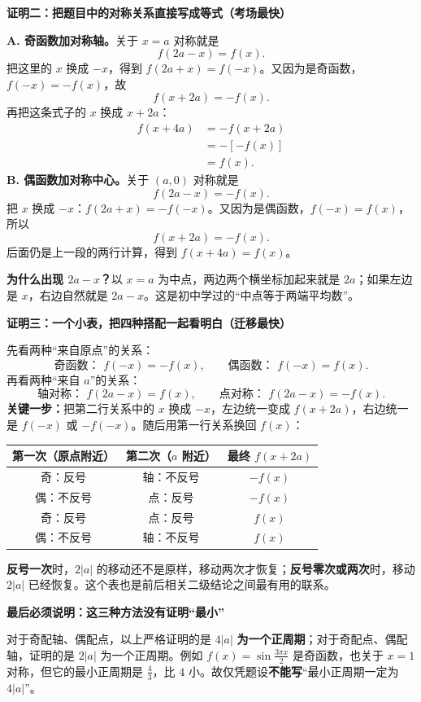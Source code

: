 \begin{proofbox}
\textbf{\textcolor{CProof}{证明二：把题目中的对称关系直接写成等式（考场最快）}}



\textbf{A. 奇函数加对称轴。}关于 $x=a$ 对称就是
\[
f(2a-x)=f(x).
\]
把这里的 $x$ 换成 $-x$，得到 $f(2a+x)=f(-x)$。又因为是奇函数，$f(-x)=-f(x)$，故
\[
\boxed{f(x+2a)=-f(x)}.
\]
再把这条式子的 $x$ 换成 $x+2a$：
\[
\begin{aligned}
f(x+4a)&=-f(x+2a)\\
&=-[-f(x)]\\
&=f(x).
\end{aligned}
\]
\textbf{B. 偶函数加对称中心。}关于 $(a,0)$ 对称就是
\[
f(2a-x)=-f(x).
\]
把 $x$ 换成 $-x$：$f(2a+x)=-f(-x)$。又因为是偶函数，$f(-x)=f(x)$，所以
\[
\boxed{f(x+2a)=-f(x)}.
\]
后面仍是上一段的两行计算，得到 $f(x+4a)=f(x)$。

\textbf{为什么出现 $2a-x$？}以 $x=a$ 为中点，两边两个横坐标加起来就是 $2a$；如果左边是 $x$，右边自然就是 $2a-x$。这是初中学过的“中点等于两端平均数”。

\medskip

\end{proofbox}
\clearpage
\begin{proofbox}
\textbf{\textcolor{CProof}{证明三：一个小表，把四种搭配一起看明白（迁移最快）}}



先看两种“来自原点”的关系：
\[
\text{奇函数： }f(-x)=-f(x),\qquad
\text{偶函数： }f(-x)=f(x).
\]
再看两种“来自 $a$”的关系：
\[
\text{轴对称： }f(2a-x)=f(x),\qquad
\text{点对称： }f(2a-x)=-f(x).
\]
\textbf{关键一步：}把第二行关系中的 $x$ 换成 $-x$，左边统一变成 $f(x+2a)$，右边统一是 $f(-x)$ 或 $-f(-x)$。随后用第一行关系换回 $f(x)$：
\begin{center}
\begin{tabular}{c|c|c}
第一次（原点附近）& 第二次（$a$ 附近） & 最终 $f(x+2a)$\\ \hline
奇：反号 & 轴：不反号 & $-f(x)$\\
偶：不反号 & 点：反号 & $-f(x)$\\
奇：反号 & 点：反号 & $f(x)$\\
偶：不反号 & 轴：不反号 & $f(x)$
\end{tabular}
\end{center}
\textbf{反号一次}时，$2|a|$ 的移动还不是原样，移动两次才恢复；\textbf{反号零次或两次}时，移动 $2|a|$ 已经恢复。这个表也是前后相关二级结论之间最有用的联系。

\medskip
\textbf{\textcolor{CProof}{最后必须说明：这三种方法没有证明“最小”}}

对于奇配轴、偶配点，以上严格证明的是 $4|a|$ \textbf{为一个正周期}；对于奇配点、偶配轴，证明的是 $2|a|$ 为一个正周期。例如 $f(x)=\sin\frac{3\pi x}{2}$ 是奇函数，也关于 $x=1$ 对称，但它的最小正周期是 $\frac43$，比 $4$ 小。故仅凭题设\textbf{不能写}“最小正周期一定为 $4|a|$”。
\end{proofbox}
